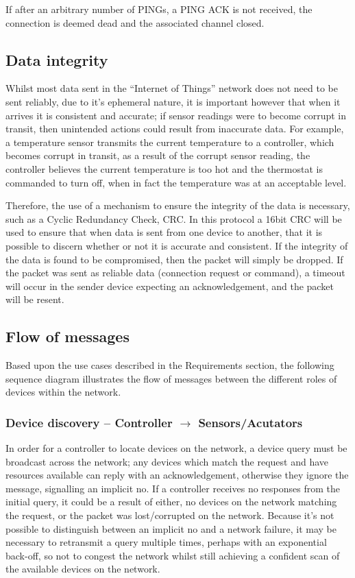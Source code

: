 If after an arbitrary number of PINGs, a PING ACK is not received, the connection is deemed dead and the associated channel closed.

\subsection{Data integrity}
\label{sub:data_integrity}
Whilst most data sent in the ``Internet of Things'' network does not need to be sent reliably, due to it's ephemeral nature, it is important however that when it arrives it is consistent and accurate; if sensor readings were to become corrupt in transit, then unintended actions could result from inaccurate data. For example, a temperature sensor transmits the current temperature to a controller, which becomes corrupt in transit, as a result of the corrupt sensor reading, the controller believes the current temperature is too hot and the thermostat is commanded to turn off, when in fact the temperature was at an acceptable level.

Therefore, the use of a mechanism to ensure the integrity of the data is necessary, such as a Cyclic Redundancy Check, CRC. In this protocol a 16bit CRC will be used to ensure that when data is sent from one device to another, that it is possible to discern whether or not it is accurate and consistent. If the integrity of the data is found to be compromised, then the packet will simply be dropped. If the packet was sent as reliable data (connection request or command), a timeout will occur in the sender device expecting an acknowledgement, and the packet will be resent. 



\subsection{Flow of messages} %
\label{sub:message_passing}
Based upon the use cases described in the Requirements section, the following sequence diagram illustrates the flow of messages between the different roles of devices within the network.

\subsubsection{Device discovery -- Controller $\rightarrow$ Sensors/Acutators} %
\label{ssub:subsubsection_name}
In order for a controller to locate devices on the network, a device query must be broadcast across the network; any devices which match the request and have resources available can reply with an acknowledgement, otherwise they ignore the message, signalling an implicit no.
If a controller receives no responses from the initial query, it could be a result of either, no devices on the network matching the request, or the packet was lost/corrupted on the network. Because it's not possible to distinguish between an implicit no and a network failure, it may be necessary to retransmit a query multiple times, perhaps with an exponential back-off, so not to congest the network whilst still achieving a confident scan of the available devices on the network.

